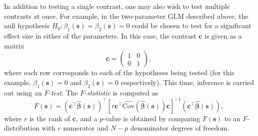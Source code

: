 In addition to testing a single contrast, one may also wish to test multiple contrasts at once. For example, in the two-parameter GLM described above, the null hypothesis $H_{0} : \beta_{1}(\bm{s}) = \beta_{2}(\bm{s}) = 0$ could be chosen to test for a significant effect size in either of the parameters. In this case, the contrast $\bm{c}$ is given as a matrix
\begin{equation}
\label{eq:f_stat_contrast}
\bm{c} = 
\begin{pmatrix}
1 & 0 \\
0 & 1
\end{pmatrix},
\end{equation}
where each row corresponds to each of the hypotheses being tested (for this example, $\beta_{1}(\bm{s}) = 0$ and $\beta_{2}(\bm{s}) = 0$ respectively). This time, inference is carried out using an $F$-\textit{test}. The $F$-\textit{statistic} is computed as 
\begin{equation}
\label{eq:f_statistic}
F(\bm{s}) = (\bm{c}^{\intercal}\bm{\hat{\beta}}(\bm{s}))^{\intercal}[r\bm{c}^{\intercal}\widehat{\mathrm{Cov}}(\hat{\bm{\beta}}(\bm{s}))\bm{c}]^{-1}(\bm{c}^{\intercal}\bm{\hat{\beta}}(\bm{s})),
\end{equation}
where $r$ is the rank of $\bm{c}$, and a $p$-value is obtained by comparing $F(\bm{s})$ to an $F$-distribution with $r$ numerator and $N-p$ denominator degrees of freedom. 

